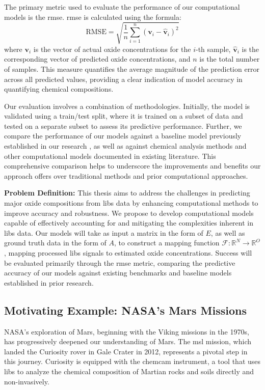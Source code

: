 The primary metric used to evaluate the performance of our computational models is the \gls{rmse}. \gls{rmse} is calculated using the formula:
\[
\text{RMSE} = \sqrt{\frac{1}{n} \sum_{i=1}^{n} (\mathbf{v}_i - \hat{\mathbf{v}}_i)^2}
\]
where \( \mathbf{v}_i \) is the vector of actual oxide concentrations for the \( i \)-th sample, \( \hat{\mathbf{v}}_i \) is the corresponding vector of predicted oxide concentrations, and \( n \) is the total number of samples. This measure quantifies the average magnitude of the prediction error across all predicted values, providing a clear indication of model accuracy in quantifying chemical compositions.

Our evaluation involves a combination of methodologies. Initially, the model is validated using a train/test split, where it is trained on a subset of data and tested on a separate subset to assess its predictive performance. Further, we compare the performance of our models against a baseline model previously established in our research \cite{p9_paper}, as well as against chemical analysis methods and other computational models documented in existing literature. This comprehensive comparison helps to underscore the improvements and benefits our approach offers over traditional methods and prior computational approaches.

\textbf{Problem Definition:} This thesis aims to address the challenges in predicting major oxide compositions from \gls{libs} data by enhancing computational methods to improve accuracy and robustness. We propose to develop computational models capable of effectively accounting for and mitigating the complexities inherent in \gls{libs} data. Our models will take as input a matrix in the form of $E$, as well as ground truth data in the form of $A$, to construct a mapping function $\mathcal{F}: \mathbb{R}^N \rightarrow \mathbb{R}^O$, mapping processed \gls{libs} signals to estimated oxide concentrations. Success will be evaluated primarily through the \gls{rmse} metric, comparing the predictive accuracy of our models against existing benchmarks and baseline models established in prior research.

\subsection{Motivating Example: NASA's Mars Missions}
NASA's exploration of Mars, beginning with the Viking missions in the 1970s, has progressively deepened our understanding of Mars\cite{marsnasagov_vikings}. The \gls{msl} mission, which landed the Curiosity rover in Gale Crater in 2012, represents a pivotal step in this journey. Curiosity is equipped with the \gls{chemcam} instrument, a tool that uses \gls{libs} to analyze the chemical composition of Martian rocks and soils directly and non-invasively\cite{chemcamNasaWebsite}.

